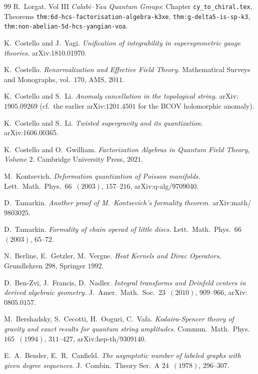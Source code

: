 \documentclass[11pt]{article}
\theoremstyle{definition}\newtheorem{definition}[theorem]{Definition}
\theoremstyle{remark}\newtheorem{remark}[theorem]{Remark}\newtheorem{example}[theorem]{Example}
\begin{document}
\begin{thebibliography}{99}
 R.~Lorgat. Vol III \emph{Calabi--Yau Quantum
Groups}: Chapter \texttt{cy\_to\_chiral.tex}, Theorems
\texttt{thm:6d-hcs-factorisation-algebra-k3xe},
\texttt{thm:g-delta5-is-sp-k3},
\texttt{thm:non-abelian-5d-hcs-yangian-voa}.

 K.~Costello and J.~Yagi.
\emph{Unification of integrability in supersymmetric gauge theories.}
arXiv:1810.01970.

 K.~Costello.
\emph{Renormalization and Effective Field Theory.} Mathematical
Surveys and Monographs, vol.~$170$, AMS, $2011$.

 K.~Costello and S.~Li.
\emph{Anomaly cancellation in the topological string.} arXiv:$1905.09269$
\textup{(}cf.~the earlier arXiv:$1201.4501$ for the BCOV holomorphic
anomaly\textup{)}.

 K.~Costello and S.~Li.
\emph{Twisted supergravity and its quantization.} arXiv:1606.00365.

 K.~Costello and O.~Gwilliam.
\emph{Factorization Algebras in Quantum Field Theory, Volume $2$.}
Cambridge University Press, $2021$.

 M.~Kontsevich.
\emph{Deformation quantization of Poisson manifolds.}
Lett.~Math.~Phys.~$66$~$(2003)$, $157$--$216$, arXiv:q-alg/$9709040$.

 D.~Tamarkin.
\emph{Another proof of M.\ Kontsevich's formality theorem.}
arXiv:math/$9803025$.

 D.~Tamarkin.
\emph{Formality of chain operad of little discs.}
Lett.~Math.~Phys.~$66$~$(2003)$, $65$--$72$.

 N.~Berline, E.~Getzler, M.~Vergne.
\emph{Heat Kernels and Dirac Operators.} Grundlehren $298$, Springer
$1992$.

 D.~Ben-Zvi, J.~Francis, D.~Nadler.
\emph{Integral transforms and Drinfeld centers in derived algebraic
geometry.} J.~Amer.~Math.~Soc.~$23$~$(2010)$, $909$--$966$,
arXiv:$0805.0157$.

 M.~Bershadsky, S.~Cecotti, H.~Ooguri, C.~Vafa.
\emph{Kodaira-Spencer theory of gravity and exact results for quantum
string amplitudes.} Commun.~Math.~Phys.~$165$~$(1994)$, $311$--$427$,
arXiv:hep-th/$9309140$.

 E.~A.~Bender, E.~R.~Canfield.
\emph{The asymptotic number of labeled graphs with given degree
sequences.} J.~Combin.~Theory Ser.~A $24$~$(1978)$, $296$--$307$.


\end{thebibliography}
\end{document}
